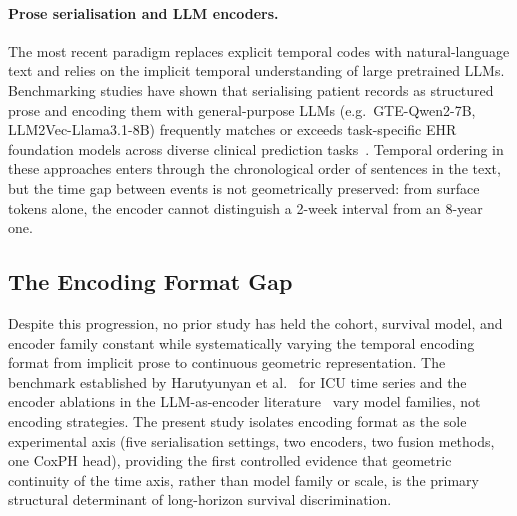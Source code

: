 \paragraph{Prose serialisation and LLM encoders.}
The most recent paradigm replaces explicit temporal codes with natural-language text and relies
on the implicit temporal understanding of large pretrained LLMs.
Benchmarking studies have shown that serialising patient records as structured prose and
encoding them with general-purpose LLMs (e.g.\ GTE-Qwen2-7B, LLM2Vec-Llama3.1-8B) frequently
matches or exceeds task-specific EHR foundation models across diverse clinical prediction
tasks~\cite{llmehrenc,serialehr}.
Temporal ordering in these approaches enters through the chronological order of sentences in
the text, but the time gap between events is not geometrically preserved: from surface tokens
alone, the encoder cannot distinguish a 2-week interval from an 8-year one.

\subsection{The Encoding Format Gap}
Despite this progression, no prior study has held the cohort, survival model, and encoder
family constant while systematically varying the temporal encoding format from implicit prose
to continuous geometric representation.
The benchmark established by Harutyunyan et al.~\cite{harutyunyan2019} for ICU time series
and the encoder ablations in the LLM-as-encoder literature~\cite{llmehrenc} vary model
families, not encoding strategies.
The present study isolates encoding format as the sole experimental axis (five serialisation
settings, two encoders, two fusion methods, one CoxPH head), providing the first controlled
evidence that geometric continuity of the time axis, rather than model family or scale, is the
primary structural determinant of long-horizon survival discrimination.

